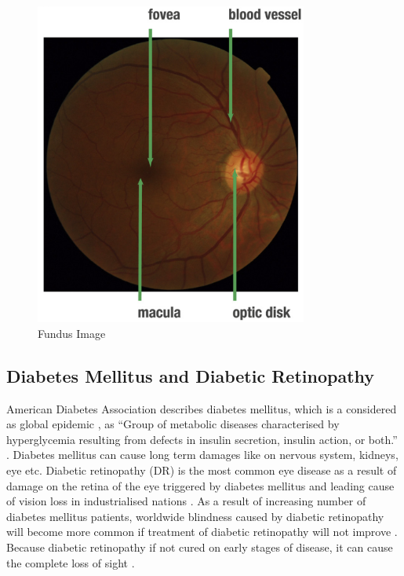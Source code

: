 \begin{figure}[t]
\centering
\includegraphics[width=0.8\textwidth]{Figures/fundus_photography_anatomical}
\caption{Fundus Image \citep[from][]{mookiah2015application}}
\label{fundusPhotoRetina}
\end{figure}


\subsection{Diabetes Mellitus and Diabetic Retinopathy}
American Diabetes Association describes diabetes mellitus, which is a considered as global epidemic \citep{falt2012modern}, as ``Group of metabolic diseases characterised by hyperglycemia resulting from defects in insulin secretion, insulin action, or both.'' \citep{national1979classification}. Diabetes mellitus can cause long term damages like on nervous system, kidneys, eye etc. Diabetic retinopathy (DR) is the most common eye disease as a result of damage on the retina of the eye triggered by diabetes mellitus and leading cause of vision loss in industrialised nations \citep{antal2014ensemble, stitt2013advances}. As a result of increasing number of diabetes mellitus patients, worldwide blindness caused by diabetic retinopathy will become more common if treatment of diabetic retinopathy will not improve \citep{wilkinson2003proposed}. Because diabetic retinopathy if not cured on early stages of disease, it can cause the complete loss of sight \citep{rocha2011points}. 

